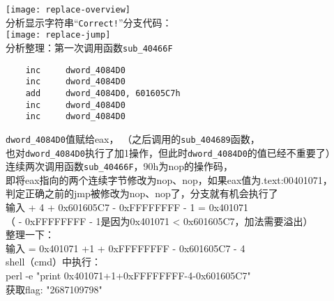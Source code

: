 \begin{enumerate}
	\texttt{[image: replace-overview]} \\
	 分析显示字符串“\lstinline$Correct!$”分支代码：\\
	\texttt{[image: replace-jump]} \\
	分析整理：第一次调用函数\lstinline$sub_40466F$\\
	\begin{lstlisting}
	inc     dword_4084D0
	inc     dword_4084D0
	add     dword_4084D0, 601605C7h
	inc     dword_4084D0
	inc     dword_4084D0
	\end{lstlisting}
	\lstinline$dword_4084D0$值赋给eax， （之后调用的\lstinline$sub_404689$函数，\\
	也对\lstinline$dword_4084D0$执行了加1操作，但此时\lstinline$dword_4084D0$的值已经不重要了）\\
	连续两次调用函数\lstinline$sub_40466F$，90h为nop的操作码，\\
	即将eax指向的两个连续字节修改为nop、nop，如果eax值为.text:00401071，\\
	判定正确之前的jmp被修改为nop、nop了，分支就有机会执行了\\
	输入 + 4 + 0x601605C7 - 0xFFFFFFFF - 1 = 0x401071 \\
	（ - 0xFFFFFFFF - 1是因为0x401071 < 0x601605C7，加法需要溢出）\\
	整理一下：\\
	输入 = 0x401071 +1 + 0xFFFFFFFF - 0x601605C7 - 4 \\
	shell（cmd）中执行：\\ 
	perl -e "print 0x401071+1+0xFFFFFFFF-4-0x601605C7" \\
	获取flag: "2687109798"
\end{enumerate}